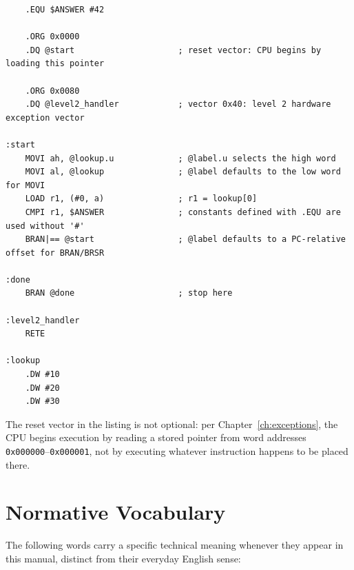 \begin{lstlisting}
    .EQU $ANSWER #42

    .ORG 0x0000
    .DQ @start                     ; reset vector: CPU begins by loading this pointer

    .ORG 0x0080
    .DQ @level2_handler            ; vector 0x40: level 2 hardware exception vector

:start
    MOVI ah, @lookup.u             ; @label.u selects the high word
    MOVI al, @lookup               ; @label defaults to the low word for MOVI
    LOAD r1, (#0, a)               ; r1 = lookup[0]
    CMPI r1, $ANSWER               ; constants defined with .EQU are used without '#'
    BRAN|== @start                 ; @label defaults to a PC-relative offset for BRAN/BRSR

:done
    BRAN @done                     ; stop here

:level2_handler
    RETE

:lookup
    .DW #10
    .DW #20
    .DW #30
\end{lstlisting}

The reset vector in the listing is not optional: per Chapter~\ref{ch:exceptions}, the CPU begins execution by reading a
stored pointer from word addresses \texttt{0x000000}--\texttt{0x000001}, not by executing whatever instruction happens
to be placed there.

\section*{Normative Vocabulary}

The following words carry a specific technical meaning whenever they appear in this manual, distinct from their
everyday English sense:

